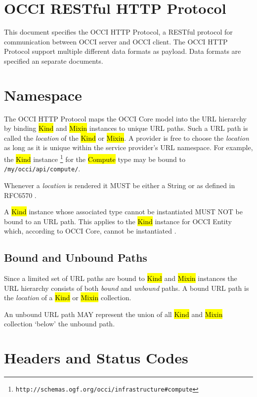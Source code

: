 \documentclass[10pt,a4paper]{article}
\begin{document}
\section{OCCI RESTful HTTP Protocol}

This document specifies the OCCI HTTP Protocol, a RESTful protocol for
communication between OCCI server and OCCI client. The OCCI HTTP Protocol
support multiple different data formats as payload. Data formats are specified
an separate documents.

\section{Namespace}
\label{sec:namspace}

The OCCI HTTP Protocol maps the OCCI Core model into the URL hierarchy by binding
\hl{Kind} and \hl{Mixin} instances to unique URL paths. Such a URL path is called
the {\em location} of the \hl{Kind} or \hl{Mixin}.
A provider is free to choose the {\em location} as long as it is unique
within the service provider's URL namespace.
For example, the \hl{Kind} instance%
\footnote{\tt http://schemas.ogf.org/occi/infrastructure\#compute}
for the \hl{Compute} type may be bound to {\tt /my/occi/api/compute/}.

Whenever a {\em location} is rendered it MUST be either a String or as
defined in RFC6570 \cite{rfc6570}.

A \hl{Kind} instance whose associated type cannot be instantiated MUST NOT be
bound to an URL path. This applies to the \hl{Kind} instance for OCCI Entity
which, according to OCCI Core, cannot be instantiated \cite{occi:core}.

\subsection{Bound and Unbound Paths}

Since a limited set of URL paths are bound to \hl{Kind} and \hl{Mixin}
instances the URL hierarchy consists of both {\em bound} and {\em unbound}
paths.
A bound URL path is the {\em location} of a \hl{Kind} or \hl{Mixin} collection.

An unbound URL path MAY represent the union of all \hl{Kind} and \hl{Mixin}
collection `below' the unbound path.

\section{Headers and Status Codes}
\label{sec:head_stat}
\end{document}
